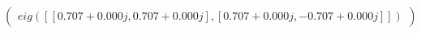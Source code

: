 \documentclass[border=1em]{standalone}
\begin{document}
$
\left(
\begin{array}{cc}
e
i
g
(
[
[
0
.
7
0
7
+
0
.
0
0
0
j
,
 
0
.
7
0
7
+
0
.
0
0
0
j
]
,
[
0
.
7
0
7
+
0
.
0
0
0
j
,
 
-
0
.
7
0
7
+
0
.
0
0
0
j
]
]
)
\end{array}
\right)
$
\end{document}
